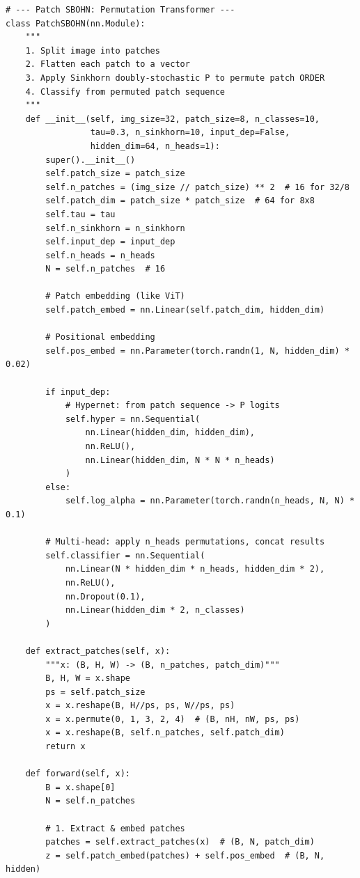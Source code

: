 \documentclass[11pt,a4paper]{report}
\begin{document}
\begin{small}
\begin{verbatim}
# --- Patch SBOHN: Permutation Transformer ---
class PatchSBOHN(nn.Module):
    """
    1. Split image into patches
    2. Flatten each patch to a vector
    3. Apply Sinkhorn doubly-stochastic P to permute patch ORDER
    4. Classify from permuted patch sequence
    """
    def __init__(self, img_size=32, patch_size=8, n_classes=10, 
                 tau=0.3, n_sinkhorn=10, input_dep=False, 
                 hidden_dim=64, n_heads=1):
        super().__init__()
        self.patch_size = patch_size
        self.n_patches = (img_size // patch_size) ** 2  # 16 for 32/8
        self.patch_dim = patch_size * patch_size  # 64 for 8x8
        self.tau = tau
        self.n_sinkhorn = n_sinkhorn
        self.input_dep = input_dep
        self.n_heads = n_heads
        N = self.n_patches  # 16
        
        # Patch embedding (like ViT)
        self.patch_embed = nn.Linear(self.patch_dim, hidden_dim)
        
        # Positional embedding
        self.pos_embed = nn.Parameter(torch.randn(1, N, hidden_dim) * 0.02)
        
        if input_dep:
            # Hypernet: from patch sequence -> P logits
            self.hyper = nn.Sequential(
                nn.Linear(hidden_dim, hidden_dim),
                nn.ReLU(),
                nn.Linear(hidden_dim, N * N * n_heads)
            )
        else:
            self.log_alpha = nn.Parameter(torch.randn(n_heads, N, N) * 0.1)
        
        # Multi-head: apply n_heads permutations, concat results
        self.classifier = nn.Sequential(
            nn.Linear(N * hidden_dim * n_heads, hidden_dim * 2),
            nn.ReLU(),
            nn.Dropout(0.1),
            nn.Linear(hidden_dim * 2, n_classes)
        )
        
    def extract_patches(self, x):
        """x: (B, H, W) -> (B, n_patches, patch_dim)"""
        B, H, W = x.shape
        ps = self.patch_size
        x = x.reshape(B, H//ps, ps, W//ps, ps)
        x = x.permute(0, 1, 3, 2, 4)  # (B, nH, nW, ps, ps)
        x = x.reshape(B, self.n_patches, self.patch_dim)
        return x
    
    def forward(self, x):
        B = x.shape[0]
        N = self.n_patches
        
        # 1. Extract & embed patches
        patches = self.extract_patches(x)  # (B, N, patch_dim)
        z = self.patch_embed(patches) + self.pos_embed  # (B, N, hidden)
        

\end{verbatim}
\end{small}
\end{document}

